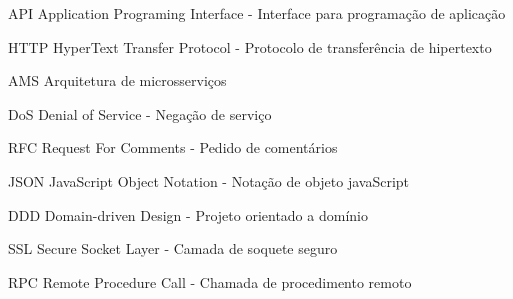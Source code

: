 
\begin{siglas}
	\item[API]{Application Programing Interface - Interface para programação de aplicação}
	\item[HTTP]{HyperText Transfer Protocol - Protocolo de transferência de hipertexto}
	\item[AMS]{Arquitetura de microsserviços}
	\item[DoS]{Denial of Service - Negação de serviço}
	\item[RFC]{Request For Comments - Pedido de comentários}
	\item[JSON]{JavaScript Object Notation - Notação de objeto javaScript}
	\item[DDD]{Domain-driven Design - Projeto orientado a domínio}
	\item[SSL]{Secure Socket Layer - Camada de soquete seguro}
	\item[RPC]{Remote Procedure Call - Chamada de procedimento remoto} 
\end{siglas}